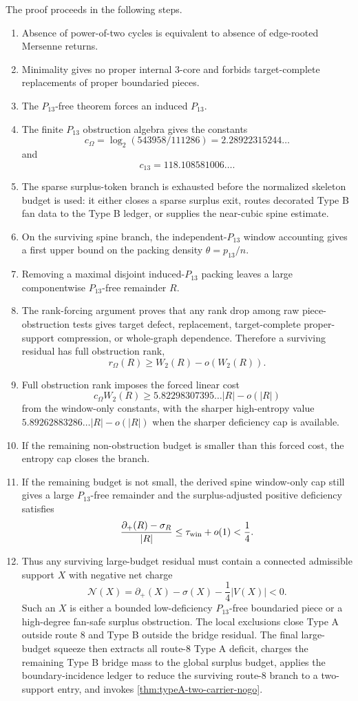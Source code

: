 \documentclass[11pt]{article}
\newcommand{\defp}{\partial_+}
\newcommand{\No}{\mathcal N}
\begin{document}
The proof proceeds in the following steps.
\begin{enumerate}[label=(\arabic*)]
\item Absence of power-of-two cycles is equivalent to absence of edge-rooted Mersenne returns.
\item Minimality gives no proper internal $3$-core and forbids target-complete replacements of proper boundaried pieces.
\item The $P_{13}$-free theorem forces an induced $P_{13}$.
\item The finite $P_{13}$ obstruction algebra gives the constants
\[
 c_\Omega=\log_2(543958/111286)=2.28922315244\ldots
\]
and
\[
 c_{13}=118.108581006\ldots .
\]
\item The sparse surplus-token branch is exhausted before the normalized
skeleton budget is used: it either closes a sparse surplus exit, routes
decorated Type B fan data to the Type B ledger, or supplies the near-cubic
spine estimate.
\item On the surviving spine branch, the independent-$P_{13}$ window
accounting gives a first upper bound on the packing density $\theta=p_{13}/n$.
\item Removing a maximal disjoint induced-$P_{13}$ packing leaves a large componentwise $P_{13}$-free remainder $R$.
\item The rank-forcing argument proves that any rank drop among raw piece-obstruction tests gives target defect, replacement, target-complete proper-support compression, or whole-graph dependence.  Therefore a surviving residual has full obstruction rank,
\[
 r_\Omega(R)\ge W_2(R)-o(W_2(R)).
\]
\item Full obstruction rank imposes the forced linear cost
\[
 c_\Omega W_2(R)\ge 5.82298307395\ldots |R|-o(|R|)
\]
from the window-only constants, with the sharper high-entropy value
$5.89262883286\ldots |R|-o(|R|)$ when the sharper deficiency cap is available.
\item If the remaining non-obstruction budget is smaller than this forced cost, the entropy cap closes the branch.
\item If the remaining budget is not small, the derived spine window-only cap
still gives a large $P_{13}$-free remainder and the surplus-adjusted positive
deficiency satisfies
\[
\frac{\defp(R)-\sigma_R}{|R|}\le \tau_{\rm win}+o(1)<\frac14.
\]
\item Thus any surviving large-budget residual must contain a connected admissible support $X$ with negative net charge
\[
\No(X)=\defp(X)-\sigma(X)-\frac14|V(X)|<0.
\]
Such an $X$ is either a bounded low-deficiency $P_{13}$-free boundaried piece or a
high-degree fan-safe surplus obstruction.  The local exclusions close Type A
outside route 8 and Type B outside the bridge residual.  The final large-budget
squeeze then extracts all route-8 Type A deficit, charges the remaining Type B
bridge mass to the global surplus budget, applies the boundary-incidence ledger to reduce
the surviving route-8 branch to a two-support entry, and invokes
\cref{thm:typeA-two-carrier-nogo}.
\end{enumerate}
\end{document}
